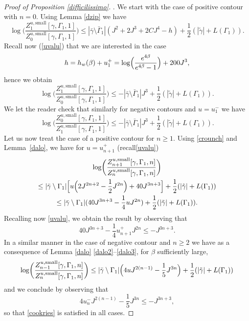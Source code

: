 \documentclass[10pt]{amsart}
\numberwithin{equation}{section}
\theoremstyle{plain}
\theoremstyle{definition}
\newcommand{\sm}{\mathrm{small}}
\newcommand{\gb}{\beta}
\newcommand{\gG}{\Gamma}
\begin{document}
\begin{proof}[Proof of Proposition \ref{difficilissimo}].
We start with the case of positive contour with $n=0$.
Using Lemma \ref{dzip} we have
\begin{equation*}
\log \biggl(\frac{ Z^{u,\sm}_{1}[\gamma,\Gamma_1,1]}{ Z^{u,\sm}_{0}[\gamma,\Gamma_1,1]}\biggr)
\le |\bar \gamma \setminus \bar \gG_1|(J^2+2J^3+2CJ^4-h)+ \frac 1 2\left(|\tilde \gamma|+L(\gG_1)\right).
\end{equation*}
Recall now (\cf \eqref{uvalu}) that we are interested in the case
\begin{equation*}
h=h_w(\gb)+u^+_1= \log\Bigl(\frac{ e^{4\gb} }{e^{4\gb}-1}\Bigr)+200J^3,
\end{equation*}
hence we obtain
\begin{equation*}
\log \biggl(\frac{ Z^{u,\sm}_{1}[\gamma,\Gamma_1,1]}{ Z^{u,\sm}_{0}[\gamma,\Gamma_1,1]}\biggr)
\le -|\bar \gamma \setminus \bar \gG_1| J^3+\frac 1 2 \left(|\tilde \gamma|+L(\gG_1)\right).
\end{equation*}
We let the reader check that similarly for negative contours and $u=u^-_1$ we have
\begin{equation*}
\log \biggl(\frac{ Z^{u,\sm}_{0}[\gamma,\Gamma_1,1]}{ Z^{u,\sm}_{1}[\gamma,\Gamma_1,1]}\biggr)
\le -|\bar \gamma \setminus \bar \gG_1| J^3+\frac{1}{2}\left(|\tilde \gamma|+L(\gG_1)\right).
\end{equation*}
Let us now treat the case of a positive contour for $n\ge 1$.
Using \eqref{crounch} and Lemma~\ref{dalo}, we have for $u=u^+_{n+1}$ (recall\eqref{uvalu})\vspace*{-5pt}%
\begin{multline*}
\log \biggl(\frac{ Z^{u,\sm}_{n+1}[\gamma,\Gamma_1,n]}{ Z^{u,\sm}_{n}[\gamma,\Gamma_1,n]}\biggr)\\
\le |\bar \gamma \setminus \Gamma_1|\Bigl[ u\Bigl(2J^{2n+2}- \frac{1}{2}J^{2n}\Bigr)+40J^{3n+3} \Bigr]+ \frac{1}{2}(|\tilde \gamma|+L(\gG_1))\\
\le |\bar \gamma \setminus \Gamma_1|(40J^{3n+3}-\frac{1}{4}u J^{2n})+ \frac{1}{2}(|\tilde \gamma|+L(\gG_1)).
\end{multline*}
Recalling now \eqref{uvalu},
we obtain the result by observing that
\begin{equation*}
40J^{3n+3}-\frac{1}{4}u^+_{n+1} J^{2n}\le -J^{3n+3}.
\end{equation*}
In a similar manner in the case of negative contour and $n\ge 2$ we have as a consequence of Lemma \ref{dalo} \eqref{dalo2}--\eqref{dalo3}, for $\gb$ sufficiently large,
\begin{equation*}
\log \biggl(\frac{ Z^{u,\sm}_{n-1}[\gamma,\Gamma_1,n]}{ Z^{u,\sm}_{n}[\gamma,\Gamma_1,n]}\biggr)
\le
|\bar \gamma \setminus \Gamma_1| \Bigl(4u J^{2(n-1)}-\frac{1}{5}J^{3n}\Bigr)+ \frac{1}{2}(|\tilde \gamma|+L(\gG_1))
\end{equation*}
and we conclude by observing that
\begin{equation*}
4u^-_n J^{2(n-1)}-\frac{1}{5}J^{3n}\le -J^{3n+3},
\end{equation*}
so that \eqref{cookries} is satisfied in all cases.
\end{proof}
\end{document}
